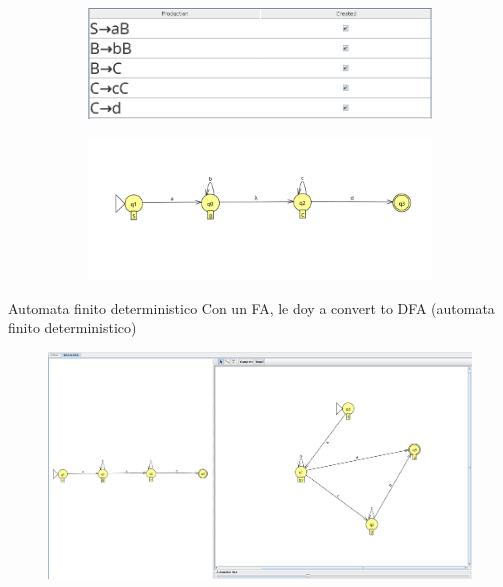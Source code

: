 \documentclass{article}
\begin{document}
            \begin{figure}[!h] 
            \centering
                \centering
                \begin{subfigure}[b]{0.55\textwidth}
                    \centering
                    \includegraphics[width=\textwidth]{./Imagenes/image10.png}
                    \label{fig:label1}
                \end{subfigure}
                \hfill
                \begin{subfigure}[b]{1.05\textwidth}
                    \centering
                    \includegraphics[width=\textwidth]{./Imagenes/image9.png}
                    \label{fig:label2}
                \end{subfigure}
                \vspace{0.5cm} 
            \end{figure}
        
        Automata finito deterministico
        Con un FA, le doy a convert to DFA (automata finito deterministico)
        \begin{figure}[!h]
            \centering
            \includegraphics[width=1.2\textwidth]{./Imagenes/image11.png}
            \label{fig:label4}
        \end{figure}
\end{document}
